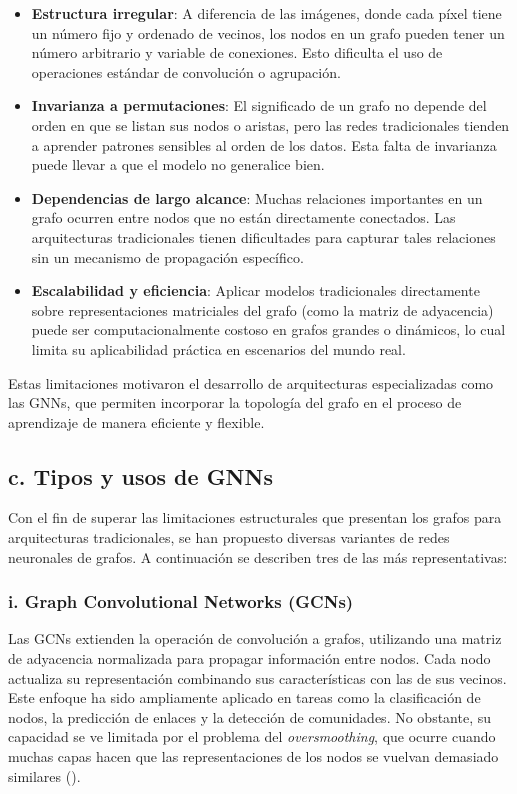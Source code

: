 \documentclass[11pt]{article} %
\begin{document}
\begin{itemize}
    \item \textbf{Estructura irregular}: A diferencia de las imágenes, donde cada píxel tiene un número fijo y ordenado de vecinos, los nodos en un grafo pueden tener un número arbitrario y variable de conexiones. Esto dificulta el uso de operaciones estándar de convolución o agrupación.

    \item \textbf{Invarianza a permutaciones}: El significado de un grafo no depende del orden en que se listan sus nodos o aristas, pero las redes tradicionales tienden a aprender patrones sensibles al orden de los datos. Esta falta de invarianza puede llevar a que el modelo no generalice bien.

    \item \textbf{Dependencias de largo alcance}: Muchas relaciones importantes en un grafo ocurren entre nodos que no están directamente conectados. Las arquitecturas tradicionales tienen dificultades para capturar tales relaciones sin un mecanismo de propagación específico.

    \item \textbf{Escalabilidad y eficiencia}: Aplicar modelos tradicionales directamente sobre representaciones matriciales del grafo (como la matriz de adyacencia) puede ser computacionalmente costoso en grafos grandes o dinámicos, lo cual limita su aplicabilidad práctica en escenarios del mundo real.
\end{itemize}

Estas limitaciones motivaron el desarrollo de arquitecturas especializadas como las GNNs, que permiten incorporar la topología del grafo en el proceso de aprendizaje de manera eficiente y flexible.

\subsection{c. Tipos y usos de GNNs}
\vspace{3pt}
Con el fin de superar las limitaciones estructurales que presentan los grafos para arquitecturas tradicionales, se han propuesto diversas variantes de redes neuronales de grafos. A continuación se describen tres de las más representativas:
    
\subsubsection{i. Graph Convolutional Networks (GCNs)}
Las GCNs extienden la operación de convolución a grafos, utilizando una matriz de adyacencia normalizada para propagar información entre nodos. Cada nodo actualiza su representación combinando sus características con las de sus vecinos. Este enfoque ha sido ampliamente aplicado en tareas como la clasificación de nodos, la predicción de enlaces y la detección de comunidades. No obstante, su capacidad se ve limitada por el problema del \textit{oversmoothing}, que ocurre cuando muchas capas hacen que las representaciones de los nodos se vuelvan demasiado similares (\cite{kipf2016semi}).
\end{document}
